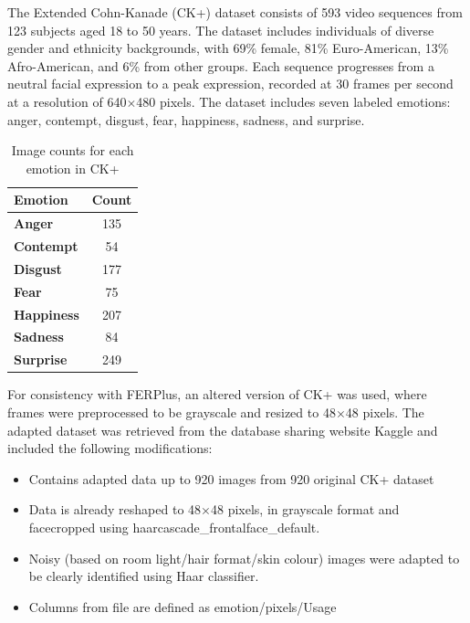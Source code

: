 The Extended Cohn-Kanade (CK+) dataset consists of 593 video sequences from 123 subjects aged 18 to 50 years. The dataset includes individuals of diverse gender and ethnicity backgrounds, with 69\% female, 81\% Euro-American, 13\% Afro-American, and 6\% from other groups. Each sequence progresses from a neutral facial expression to a peak expression, recorded at 30 frames per second at a resolution of 640\(\times\)480 pixels. The dataset includes seven labeled emotions: anger, contempt, disgust, fear, happiness, sadness, and surprise.

\begin{table}[!htb]
    \centering{}
    \caption{Image counts for each emotion in CK+}
    \begin{tabular}{|l|c|}
        \hline
        \textbf{Emotion}   & \textbf{Count} \\ \hline
        \textbf{Anger}     & 135   \\ \hline
        \textbf{Contempt}  & 54    \\ \hline
        \textbf{Disgust}   & 177   \\ \hline
        \textbf{Fear}      & 75    \\ \hline
        \textbf{Happiness} & 207   \\ \hline
        \textbf{Sadness}   & 84    \\ \hline
        \textbf{Surprise}  & 249   \\ \hline
    \end{tabular}
\label{tab:emotion_counts_ck+}
\end{table}

For consistency with FERPlus, an altered version of CK+ was used, where frames were preprocessed to be grayscale and resized to 48\(\times\)48 pixels. The adapted dataset was retrieved from the database sharing website Kaggle and included the following modifications:

\begin{itemize}
    \item{} Contains adapted data up to 920 images from 920 original CK+ dataset
    \item{} Data is already reshaped to 48\(\times\)48 pixels, in grayscale format and facecropped using haarcascade\_frontalface\_default.
    \item{} Noisy (based on room light/hair format/skin colour) images were adapted to be clearly identified using Haar classifier.
    \item{} Columns from file are defined as emotion/pixels/Usage
\end{itemize}

